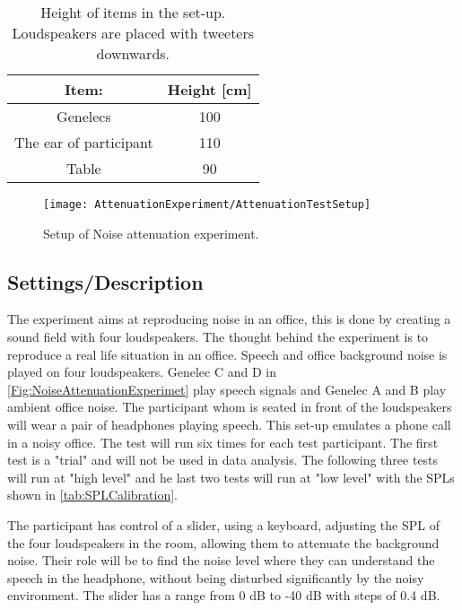 \begin{table} [h]
	\centering
	\begin{tabular}{c c} \toprule
		\centering
		 Item:			 			& Height [cm] 	\\ \bottomrule
		Genelecs					  	& 100				\\
		The ear of participant			& 110				\\ 
		Table							& 90				\\ \bottomrule 
	\end{tabular}
	\caption{Height of items in the set-up. Loudspeakers are placed with tweeters downwards.}
	\label{Tab:NoiseAttenuationDimensions}
\end{table}


\begin{figure}[H]
	\centering
%	
	\texttt{[image: AttenuationExperiment/AttenuationTestSetup]}
	\caption{Setup of Noise attenuation experiment.}
	\label{Fig:NoiseAttenuationExperimet}
\end{figure}


\subsection{Settings/Description}
The experiment aims at reproducing noise in an office, this is done by creating a sound field with four loudspeakers. 
The thought behind the experiment is to reproduce a real life situation in an office. Speech and office background noise is played on four loudspeakers. Genelec C and D in \autoref{Fig:NoiseAttenuationExperimet} play speech signals and Genelec A and B play ambient office noise. The participant whom is seated in front of the loudspeakers will wear a pair of headphones playing speech. This set-up emulates a phone call in a noisy office. The test will run six times for each test participant. The first test is a "trial" and will not be used in data analysis. The following three tests will run at "high level" and he last two tests will run at "low level" with the SPLs shown in \autoref{tab:SPLCalibration}. 

The participant has control of a slider, using a keyboard, adjusting the SPL of the four loudspeakers in the room, allowing them to attenuate the background noise. Their role will be to find the noise level where they can understand the speech in the headphone, without being disturbed significantly by the noisy environment. The slider has a range from 0 dB to -40 dB with steps of 0.4 dB. 

